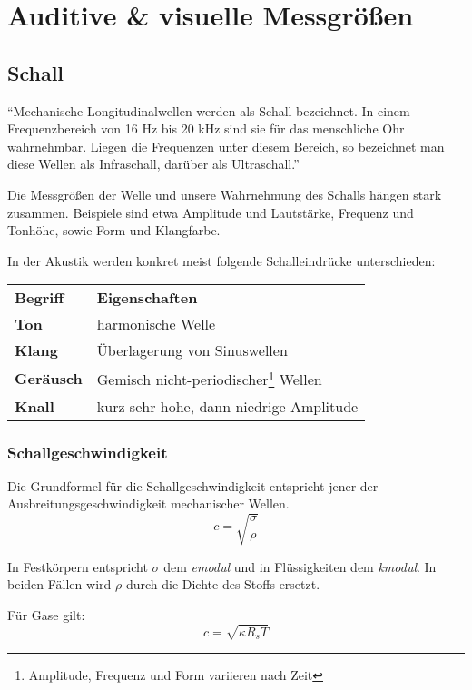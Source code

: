 \section{Auditive \& visuelle Messgrößen}
\subsection{Schall}
\enquote{Mechanische Longitudinalwellen werden als Schall bezeichnet. In einem Frequenzbereich von 16 Hz bis 20 kHz sind sie für das menschliche Ohr wahrnehmbar. Liegen die Frequenzen unter diesem Bereich, so bezeichnet man diese Wellen als Infraschall, darüber als Ultraschall.} \cite[S. 145]{physik1}

Die Messgrößen der Welle und unsere Wahrnehmung des Schalls hängen stark zusammen. Beispiele sind etwa Amplitude und Lautstärke, Frequenz und Tonhöhe, sowie Form und Klangfarbe.

In der Akustik werden konkret meist folgende Schalleindrücke unterschieden:

\begin{tabularx}{\textwidth}{l l}
	\textbf{Begriff} & \textbf{Eigenschaften}\\
	\textbf{Ton} & harmonische Welle\\
	\textbf{Klang} & Überlagerung von Sinuswellen\\
	\textbf{Geräusch} & Gemisch nicht-periodischer\footnote{Amplitude, Frequenz und Form variieren nach Zeit} Wellen\\
	\textbf{Knall} & kurz sehr hohe, dann niedrige Amplitude
\end{tabularx}

\subsubsection{Schallgeschwindigkeit}
Die Grundformel für die Schallgeschwindigkeit entspricht jener der Ausbreitungsgeschwindigkeit mechanischer Wellen.
$$c = \sqrt{\frac{\sigma}{\rho}}$$
\begin{vardef}
\end{vardef}

In Festkörpern entspricht $\sigma$ dem \textit{\gls{emodul}} und in Flüssigkeiten dem \textit{\gls{kmodul}}. In beiden Fällen wird $\rho$ durch die Dichte des Stoffs ersetzt.

Für Gase gilt:
$$c = \sqrt{\kappa R_s T}$$
\begin{vardef}
\end{vardef}

